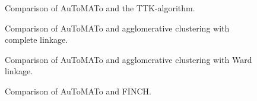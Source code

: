 \documentclass[10pt]{article} %
\theoremstyle{plain}
\newcommand{\aut}{AuToMATo\xspace}
\begin{document}


\begin{figure}[ht]
    \centering
    
    \caption{Comparison of \aut and the TTK-algorithm.}
    \label{fig:aut_vs_ttk}
\end{figure}



\begin{figure}[ht]
    \centering
    
    \caption{Comparison of \aut and agglomerative clustering with complete linkage.}
    \label{fig:aut_vs_linkage_complete}
\end{figure}



\begin{figure}[ht]
    \centering
    
    \caption{Comparison of \aut and agglomerative clustering with Ward linkage.}
    \label{fig:aut_vs_linkage_ward}
\end{figure}



\begin{figure}[ht]
    \centering
    
    \caption{Comparison of \aut and FINCH.}
    \label{fig:aut_vs_finch}
\end{figure}

\end{document}
